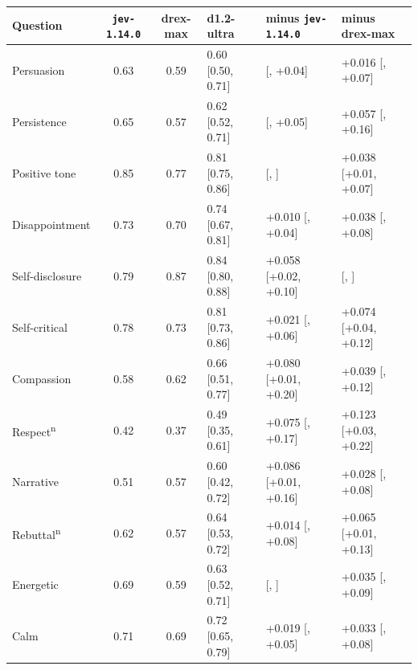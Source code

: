{\scriptsize\setlength{\tabcolsep}{4pt}
\begin{tabular}{@{}l cc l l l@{}}
\toprule
Question & \texttt{jev-1.14.0} & drex-max & d1.2-ultra & minus \texttt{jev-1.14.0} & minus drex-max \\
\midrule
Persuasion & 0.63 & 0.59 & 0.60 {\scriptsize[0.50, 0.71]} & \textminus 0.025 {\scriptsize[\textminus 0.09, +0.04]} & +0.016 {\scriptsize[\textminus 0.05, +0.07]} \\
Persistence & 0.65 & 0.57 & 0.62 {\scriptsize[0.52, 0.71]} & \textminus 0.024 {\scriptsize[\textminus 0.11, +0.05]} & +0.057 {\scriptsize[\textminus 0.03, +0.16]} \\
Positive tone & 0.85 & 0.77 & 0.81 {\scriptsize[0.75, 0.86]} & \textminus 0.034 {\scriptsize[\textminus 0.06, \textminus 0.00]} & +0.038 {\scriptsize[+0.01, +0.07]} \\
Disappointment & 0.73 & 0.70 & 0.74 {\scriptsize[0.67, 0.81]} & +0.010 {\scriptsize[\textminus 0.02, +0.04]} & +0.038 {\scriptsize[\textminus 0.00, +0.08]} \\
Self-disclosure & 0.79 & 0.87 & 0.84 {\scriptsize[0.80, 0.88]} & +0.058 {\scriptsize[+0.02, +0.10]} & \textminus 0.027 {\scriptsize[\textminus 0.05, \textminus 0.00]} \\
Self-critical & 0.78 & 0.73 & 0.81 {\scriptsize[0.73, 0.86]} & +0.021 {\scriptsize[\textminus 0.02, +0.06]} & +0.074 {\scriptsize[+0.04, +0.12]} \\
Compassion & 0.58 & 0.62 & 0.66 {\scriptsize[0.51, 0.77]} & +0.080 {\scriptsize[+0.01, +0.20]} & +0.039 {\scriptsize[\textminus 0.02, +0.12]} \\
Respect\textsuperscript{n} & 0.42 & 0.37 & 0.49 {\scriptsize[0.35, 0.61]} & +0.075 {\scriptsize[\textminus 0.03, +0.17]} & +0.123 {\scriptsize[+0.03, +0.22]} \\
Narrative & 0.51 & 0.57 & 0.60 {\scriptsize[0.42, 0.72]} & +0.086 {\scriptsize[+0.01, +0.16]} & +0.028 {\scriptsize[\textminus 0.01, +0.08]} \\
Rebuttal\textsuperscript{n} & 0.62 & 0.57 & 0.64 {\scriptsize[0.53, 0.72]} & +0.014 {\scriptsize[\textminus 0.04, +0.08]} & +0.065 {\scriptsize[+0.01, +0.13]} \\
Energetic & 0.69 & 0.59 & 0.63 {\scriptsize[0.52, 0.71]} & \textminus 0.063 {\scriptsize[\textminus 0.11, \textminus 0.01]} & +0.035 {\scriptsize[\textminus 0.01, +0.09]} \\
Calm & 0.71 & 0.69 & 0.72 {\scriptsize[0.65, 0.79]} & +0.019 {\scriptsize[\textminus 0.02, +0.05]} & +0.033 {\scriptsize[\textminus 0.01, +0.08]} \\

\end{tabular}}
